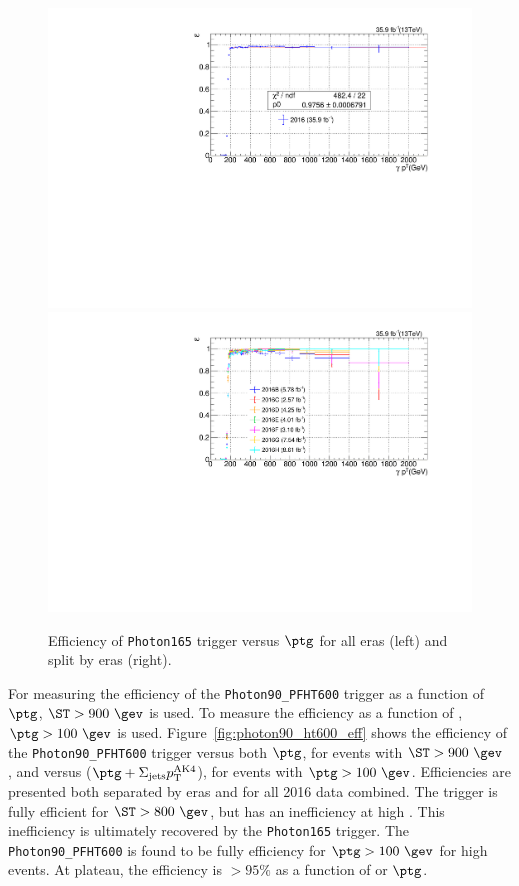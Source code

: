 \begin{figure}[htbp!]
  \centering
  \includegraphics[width=0.48\linewidth]{../Figures/Chap3/triggers/photon165_eff_allEras.pdf}
  \includegraphics[width=0.48\linewidth]{../Figures/Chap3/triggers/photon165_eff_versusEra.pdf}
  \captionsetup{width=.9\linewidth}
  \caption{Efficiency of \texttt{Photon165} trigger versus $\ptg$ for all eras (left) and split by eras (right).}
  \label{fig:photon165_eff}
\end{figure}

For measuring the efficiency of the \texttt{Photon90\_PFHT600} trigger as a function of $\ptg$, $\ST>900~\gev$ is used. To measure the efficiency as a function of \ST, $\ptg>100~\gev$ is used. Figure~\ref{fig:photon90_ht600_eff} shows the efficiency of the \texttt{Photon90\_PFHT600} trigger versus
both $\ptg$, for events with $\ST>900~\gev$ , and versus \ST ($\ptg + \Sigma_{\text{jets}} \pt^{\text{AK4}}$), for events with $\ptg>100~\gev$.  Efficiencies are presented both separated by eras and for all 2016 data combined.  The trigger is fully efficient for $\ST>800~\gev$, but has an inefficiency at high \ST.  
This inefficiency is ultimately recovered by the \texttt{Photon165} trigger.  The
\texttt{Photon90\_PFHT600} is found to be fully efficiency for $\ptg>100~\gev$
for high \ST events. At plateau, the efficiency is $>95\%$ as a function of \ST or $\ptg$.

